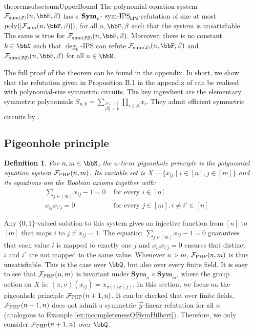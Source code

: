\documentclass[10pt,a4paper]{article}
\newtheorem{definition}[theorem]{Definition}
\newcommand{\Sym}{{\mathbf{Sym}}}
\newcommand{\IPS}{\mathrm{IPS}}
\newcommand{\Ff}{{\cal F}}
\newcommand{\PHP}{\Ff_{\mathrm{PHP}}}
\newcommand{\poly}{\text{\upshape poly}}
\newcommand{\symIPSlin}{\text{ \upshape sym-IPS}_{\mathsf{LIN}}}
\begin{document}
\begin{restatable}{theorem}{subsetsumUpperBound}
	\label{thm:symRefutationSubsetSum}
	The polynomial equation system $\Ff_{\text{sum}(\vec x)}(n,\bbF,\beta)$ has a $\Sym_n\text{-}\symIPSlin{}$-refutation of size at most $\poly(| \Ff_{\text{sum}}(n,\bbF,\beta) |)$, for all $n, \bbF, \beta$ such that the system is unsatisfiable.
	The same is true for $\Ff_{\text{sum}(\vec x \vec y)}(n,\bbF,\beta)$.
	 Moreover, there is no constant $k \in \bbN$ such that $\deg_k\text{-}\IPS$ can refute $\Ff_{\text{sum}(\vec x)}(n,\bbF,\beta)$ and $\Ff_{\text{sum}(\vec x \vec y)}(n,\bbF,\beta)$ for all $n \in \bbN$.
\end{restatable}	
The full proof of the theorem can be found in the appendix. In short, we show that the refutation given in Proposition B.1 in the appendix of \cite{lowerbounds_IPS} can be realised with polynomial-size symmetric circuits. The key ingredient are the elementary symmetric polynomials $S_{n,k} = \sum_{\stackrel{S \subseteq [n]}{|S| = k}} \prod_{i \in S} x_i$. They admit efficient symmetric circuits by \cite{shpilka2001depth}.


\subsection{Pigeonhole principle}


\begin{definition}
	For $n,m \in \bbN$, the $n$-to-$m$ \emph{pigeonhole principle} is the polynomial equation system $\PHP(n,m)$. Its variable set is $X = \{x_{ij} \mid i \in [n], j \in [m]\}$ and its equations are the Boolean axioms together with:
	\begin{align*}
		\sum_{j \in [m]} x_{ij} - 1 = 0&\text{    for every } i \in [n]\\
		x_{ij}x_{i'j} = 0& \text{    for every } j \in [m], i \neq i' \in [n]
	\end{align*}
\end{definition}	
Any $\{0,1\}$-valued solution to this system gives an injective function from $[n]$ to $[m]$ that maps $i$ to $j$ if $x_{ij} = 1$.  The equation $\sum_{j \in [m]} x_{ij} - 1 = 0$ guarantees that each value $i$ is mapped to exactly one $j$ and $x_{ij}x_{i'j}  = 0$ ensures that distinct $i$ and $i'$ are not mapped to the same value.
Whenever $n > m$, $\PHP(n,m)$ is thus unsatisfiable. This is the case over $\bbQ$, but also over every finite field.
It is easy to see that $\PHP(n,m)$ is invariant under $\Sym_n \times \Sym_m$, where the group action on $X$ is: $(\pi,\sigma)(x_{ij}) = x_{\pi(i)\sigma(j)}$. In this section, we focus on the pigeonhole principle $\PHP(n+1,n)$. It can be checked that over finite fields, $\PHP(n+1,n)$ does not admit a symmetric $\vec{y}$-linear refutation for all $n$ (analogous to Example \ref{ex:incompletenessOfSymHilbert}). Therefore, we only consider $\PHP(n+1,n)$ over $\bbQ$.
\end{document}
